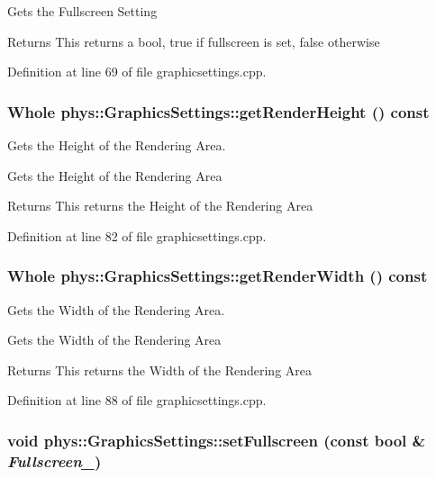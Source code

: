 Gets the Fullscreen Setting \begin{DoxyReturn}{Returns}
This returns a bool, true if fullscreen is set, false otherwise 
\end{DoxyReturn}


Definition at line 69 of file graphicsettings.cpp.

\hypertarget{classphys_1_1GraphicsSettings_a118171db4fc0a2b17da4284cc91fbeb4}{
\subsubsection[{getRenderHeight}]{\setlength{\rightskip}{0pt plus 5cm}Whole phys::GraphicsSettings::getRenderHeight () const}}
\label{dc/df1/classphys_1_1GraphicsSettings_a118171db4fc0a2b17da4284cc91fbeb4}


Gets the Height of the Rendering Area. 

Gets the Height of the Rendering Area \begin{DoxyReturn}{Returns}
This returns the Height of the Rendering Area 
\end{DoxyReturn}


Definition at line 82 of file graphicsettings.cpp.

\hypertarget{classphys_1_1GraphicsSettings_aa8a8548afca8d3e127a1be69a2c1eba2}{
\subsubsection[{getRenderWidth}]{\setlength{\rightskip}{0pt plus 5cm}Whole phys::GraphicsSettings::getRenderWidth () const}}
\label{dc/df1/classphys_1_1GraphicsSettings_aa8a8548afca8d3e127a1be69a2c1eba2}


Gets the Width of the Rendering Area. 

Gets the Width of the Rendering Area \begin{DoxyReturn}{Returns}
This returns the Width of the Rendering Area 
\end{DoxyReturn}


Definition at line 88 of file graphicsettings.cpp.

\hypertarget{classphys_1_1GraphicsSettings_aba9e127ab2cf3f20604313e39d32f7a8}{
\subsubsection[{setFullscreen}]{\setlength{\rightskip}{0pt plus 5cm}void phys::GraphicsSettings::setFullscreen (const bool \& {\em Fullscreen\_\-})}}
\label{dc/df1/classphys_1_1GraphicsSettings_aba9e127ab2cf3f20604313e39d32f7a8}


